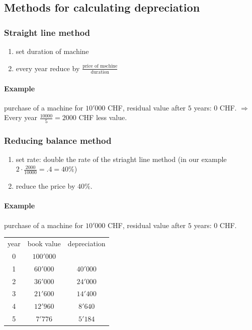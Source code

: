 \documentclass[a4paper] {scrartcl}
\begin{document}
\subsection{Methods for calculating depreciation}
\subsubsection{Straight line method}
	\begin{enumerate}
		\item set duration of machine
		\item every year reduce by $\frac{\text{price of mschine}}{\text{duration}}$
	\end{enumerate}
	\paragraph{Example} %
	\label{par:example}
	purchase of a machine for $10'000$ CHF, residual value after $5$ years: $0$ CHF.
	$\Rightarrow$ Every year $\frac{10000}{5}=2000$ CHF less value.
	
	
\subsubsection{Reducing balance method}
\begin{enumerate}
	\item set rate: double the rate of the striaght line method (in our example $2\cdot\frac{2000}{10000}=.4=40\%$)
	\item reduce the price by $40\%$.
\end{enumerate}
\paragraph{Example} %
\label{par:example}
purchase of a machine for $10'000$ CHF, residual value after $5$ years: $0$ CHF.

\begin{tabular}{|c|c|c|}
	\hline
	year & book value & depreciation\\
	0 & $100'000$ & \\
	1 & $60'000$ & $40'000$\\
	2 & $36'000$ & $24'000$\\
	3 & $21'600$ & $14'400$\\
	4 & $12'960$ & $8'640$\\
	5 & $7'776$ & $5'184$\\
	\hline
\end{tabular}
\end{document}
